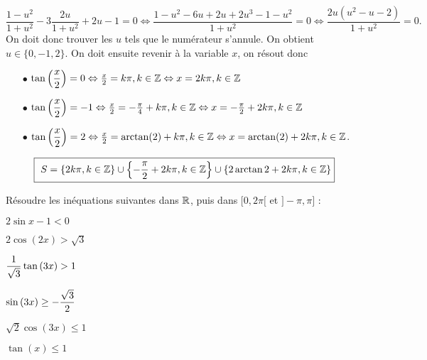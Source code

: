 \documentclass[a4paper, 11pt]{article}
\begin{document}
\begin{correction}
\begin{enumerate}
$$\frac{1-u^2}{1+u^2} - 3 \frac{2u}{1+u^2} + 2u - 1 = 0 \Leftrightarrow \frac{1-u^2- 6u + 2u +2u^3-1-u^2}{1+u^2} = 0   \Leftrightarrow \frac{2u(u^2-u-2)}{1+u^2}  = 0.$$
On doit donc trouver les $u$ tels que le num\'erateur s'annule. On obtient $u \in \{0,-1, 2\}$. On doit ensuite revenir \`a la variable $x$, on r\'esout donc 
\begin{itemize}
\item[$\bullet$] $\tan\left( \displaystyle \frac{x}{2} \right) = 0 \Leftrightarrow \frac{x}{2} = k \pi, k \in \mathbb{Z} \Leftrightarrow  x = 2k\pi, k \in \mathbb{Z}$ 
\item[$\bullet$] $\tan\left( \displaystyle \frac{x}{2} \right) = -1\Leftrightarrow \frac{x}{2} = - \frac{\pi}{4} + k \pi, k \in \mathbb{Z} \Leftrightarrow  x = - \frac{\pi}{2} +2k\pi, k \in \mathbb{Z}$ 
\item[$\bullet$] $\tan\left( \displaystyle \frac{x}{2} \right) = 2 \Leftrightarrow \frac{x}{2} = \arctan(2) + k \pi, k \in \mathbb{Z} \Leftrightarrow  x = \arctan(2)  +2k\pi, k \in \mathbb{Z}$.
\end{itemize}
$$\fbox{ $ S = \displaystyle \left\{2 k \pi, k \in \mathbb{Z} \right\} \cup  \left\{-\frac{\pi}{2} + 2 k\pi, k \in \mathbb{Z} \right\} \cup \left\{2\arctan 2 + 2 k \pi, k \in \mathbb{Z} \right\} $}$$
\end{enumerate}
\end{correction}









\begin{exercice}   \;
R\'esoudre les in\'equations suivantes dans $\mathbb{R}$, puis dans $\lbrack 0,2\pi\lbrack$ et $\rbrack -\pi,\pi\rbrack$ :
\begin{enumerate}
\begin{minipage}[t]{0.45\textwidth}
\item $2\sin{x}-1<0$
\item $2\cos{(2x)}>\sqrt{3}$
\item $\displaystyle\frac{1}{\sqrt{3}}\tan{(3x)}>1$
\end{minipage}
\begin{minipage}[t]{0.45\textwidth}
\item $\sin{(3x)}\geq -\displaystyle\frac{\sqrt{3}}{2}$
\item $\sqrt{2}\cos{(3x)}\leq 1$
\item $\tan{(x)}\leq 1$
\end{minipage}
\end{enumerate}
\end{exercice}
\end{document}
